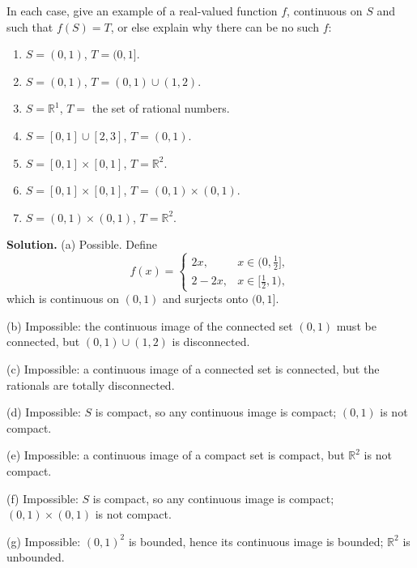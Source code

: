 \begin{problembox}
In each case, give an example of a real-valued function \( f \), continuous on \( S \) and such that \( f(S) = T \), or else explain why there can be no such \( f \):
\begin{enumerate}[label=(\alph*)]
\item \( S = (0, 1) \), \( T = (0, 1] \).
\item \( S = (0, 1) \), \( T = (0, 1) \cup (1, 2) \).
\item \( S = \mathbb{R}^1 \), \( T = \) the set of rational numbers.
\item \( S = [0, 1] \cup [2, 3] \), \( T = (0, 1) \).
\item \( S = [0, 1] \times [0, 1] \), \( T = \mathbb{R}^2 \).
\item \( S = [0, 1] \times [0, 1] \), \( T = (0, 1) \times (0, 1) \).
\item \( S = (0, 1) \times (0, 1) \), \( T = \mathbb{R}^2 \).
\end{enumerate}
\end{problembox}


\noindent\textbf{Solution.}
(a) Possible. Define
\[
f(x)=\begin{cases}
2x,& x\in(0,\tfrac12],\\
2-2x,& x\in[\tfrac12,1),
\end{cases}
\]
which is continuous on $(0,1)$ and surjects onto $(0,1]$.

(b) Impossible: the continuous image of the connected set $(0,1)$ must be connected, but $(0,1)\cup(1,2)$ is disconnected.

(c) Impossible: a continuous image of a connected set is connected, but the rationals are totally disconnected.

(d) Impossible: $S$ is compact, so any continuous image is compact; $(0,1)$ is not compact.

(e) Impossible: a continuous image of a compact set is compact, but $\mathbb{R}^2$ is not compact.

(f) Impossible: $S$ is compact, so any continuous image is compact; $(0,1)\times(0,1)$ is not compact.

(g) Impossible: $(0,1)^2$ is bounded, hence its continuous image is bounded; $\mathbb{R}^2$ is unbounded.
\medskip

